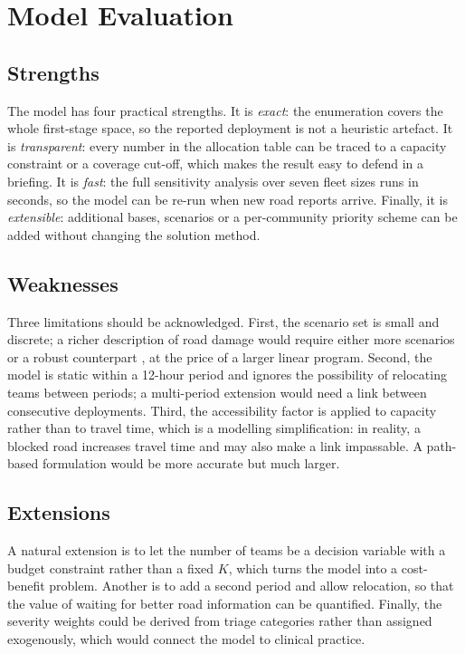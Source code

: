 \documentclass{apmcmthesis}
\begin{document}
\section{Model Evaluation}

\subsection{Strengths}

The model has four practical strengths. It is \emph{exact}: the enumeration covers the whole first-stage space, so the reported deployment is not a heuristic artefact. It is \emph{transparent}: every number in the allocation table can be traced to a capacity constraint or a coverage cut-off, which makes the result easy to defend in a briefing. It is \emph{fast}: the full sensitivity analysis over seven fleet sizes runs in seconds, so the model can be re-run when new road reports arrive. Finally, it is \emph{extensible}: additional bases, scenarios or a per-community priority scheme can be added without changing the solution method.

\subsection{Weaknesses}

Three limitations should be acknowledged. First, the scenario set is small and discrete; a richer description of road damage would require either more scenarios or a robust counterpart \cite{bental2009}, at the price of a larger linear program. Second, the model is static within a 12-hour period and ignores the possibility of relocating teams between periods; a multi-period extension would need a link between consecutive deployments. Third, the accessibility factor is applied to capacity rather than to travel time, which is a modelling simplification: in reality, a blocked road increases travel time and may also make a link impassable. A path-based formulation would be more accurate but much larger.

\subsection{Extensions}

A natural extension is to let the number of teams be a decision variable with a budget constraint rather than a fixed $K$, which turns the model into a cost-benefit problem. Another is to add a second period and allow relocation, so that the value of waiting for better road information can be quantified. Finally, the severity weights could be derived from triage categories rather than assigned exogenously, which would connect the model to clinical practice.
\end{document}
